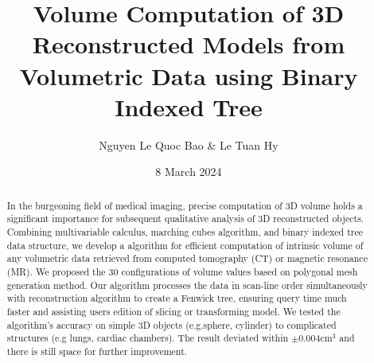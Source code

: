 \documentclass[11pt]{article}
\title{Volume Computation of 3D Reconstructed Models from Volumetric Data using Binary Indexed Tree}
\author{Nguyen Le Quoc Bao \& Le Tuan Hy}
\date{8 March 2024}
\begin{document}
\maketitle

\begin{center}
\begin{minipage}{0.8\textwidth}
\setlength{\leftskip}{3.5cm} 
\setlength{\rightskip}{3.5cm}
\begin{abstract}
    In the burgeoning field of medical imaging, precise computation of 3D volume holds a significant importance for subsequent qualitative analysis of 3D reconstructed objects. Combining multivariable calculus, marching cubes algorithm, and binary indexed tree data structure, we develop a algorithm for efficient computation of intrinsic volume of any volumetric data retrieved from computed tomography (CT) or magnetic resonance (MR). We proposed the 30 configurations of volume values based on polygonal mesh generation method. Our algorithm processes the data in scan-line order simultaneously with reconstruction algorithm to create a Fenwick tree,  ensuring query time much faster and assisting users edition of slicing or transforming model. We tested the algorithm's accuracy on simple 3D objects (e.g.sphere, cylinder) to complicated structures (e.g lungs, cardiac chambers). The result deviated within $\pm 0.004 \text{cm}^3$ and there is still space for further improvement.
\end{abstract}
\end{minipage}
\end{center}
\end{document}
